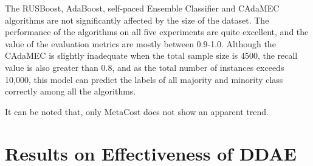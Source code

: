 The RUSBoost, AdaBoost, self-paced Ensemble Classifier and CAdaMEC algorithms are not significantly affected by the size of the dataset. The performance of the algorithms on all five experiments are quite excellent, and the value of the evaluation metrics are mostly between 0.9-1.0. Although the CAdaMEC is slightly inadequate when the total sample size is 4500, the recall value is also greater than 0.8, and as the total number of instances exceeds 10,000, this model can predict the labels of all majority and minority class correctly among all the algorithms. 

It can be noted that, only MetaCost does not show an apparent trend.

\section{Results on Effectiveness of DDAE}
